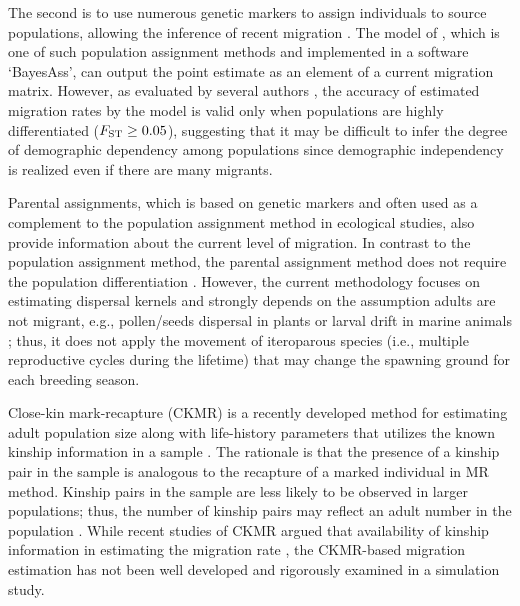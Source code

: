 \documentclass[12pt, English]{article}
\begin{document}
\begin{spacing}{1.9}

The second is to use numerous genetic markers to assign individuals to source populations, allowing the inference of recent migration \cite[since][]{https://doi.org/10.1111/j.1365-294X.1995.tb00227.x}. The model of \cite{Wilson_2003}, which is one of such population assignment methods and implemented in a software `BayesAss', can output the point estimate as an element of a current migration matrix. However, as evaluated by several authors \cite[]{https://doi.org/10.1111/j.1365-294X.2007.03218.x, https://doi.org/10.1111/mec.12806}, the accuracy of estimated migration rates by the model is valid only when populations are highly differentiated ($F_{\rm ST}\ge0.05$), suggesting that it may be difficult to infer the degree of demographic dependency among populations since demographic independency is realized even if there are many migrants. 


Parental assignments, which is based on genetic markers and often used as a complement to the population assignment method in ecological studies, also provide information about the current level of migration. In contrast to the population assignment method, the parental assignment method does not require the population differentiation \cite[]{https://doi.org/10.1111/mec.12806}. However, the current methodology focuses on estimating dispersal kernels and strongly depends on the assumption adults are not migrant, e.g., pollen/seeds dispersal in plants \cite[]{doi:10.1080/07352689.2010.481167} or larval drift in marine animals \cite[]{https://doi.org/10.1111/eva.12288}; thus, it does not apply the movement of iteroparous species (i.e., multiple reproductive cycles during the lifetime) that may change the spawning ground for each breeding season. 


Close-kin mark-recapture (CKMR) is a recently developed method for estimating adult population size along with life-history parameters that utilizes the known kinship information in a sample \cite[reviewed in][]{https://doi.org/10.1111/faf.12615}. The rationale is that the presence of a kinship pair in the sample is analogous to the recapture of a marked individual in MR method. Kinship pairs in the sample are less likely to be observed in larger populations; thus, the number of kinship pairs may reflect an adult number in the population \cite[]{bravington2016close}. While recent studies of CKMR argued that availability of kinship information in estimating the migration rate \cite[]{https://doi.org/10.1002/ece3.6296, 10.1093/icesjms/fsac002}, the CKMR-based migration estimation has not been well developed and rigorously examined in a simulation study. 


\end{spacing}
\end{document}
